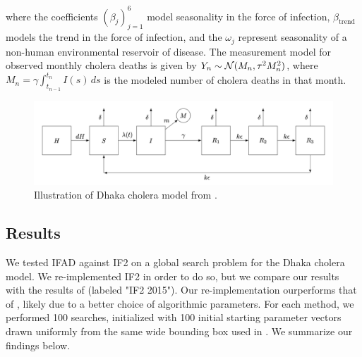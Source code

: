 \documentclass[11pt]{article}
\newcommand\arxiv[2]{#1} %
\begin{document}
where the coefficients $(\beta_j)_{j=1}^6$ model seasonality in the force of infection, $\beta_{\text{trend}}$ models the trend in the force of infection, and the $\omega_j$ represent seasonality of a non-human environmental reservoir of disease.
The measurement model for observed monthly cholera deaths is given by 
    $Y_n \sim {\mathcal{N}}(M_n, \tau^2M_n^2)$,
where $M_n=\gamma\int_{t_{n-1}}^{t_n}I(s)\, ds$ is the modeled number of cholera deaths in that month.


\begin{figure}
    \centering
    \includegraphics[width=\arxiv{12cm}{\textwidth/2}]{../imgs/095/tikzcholera.png}
    \vspace*{-7mm}
    \caption{Illustration of Dhaka cholera model from \cite{king08}. }
    \label{fig:tikz-cholera}
\end{figure}

\subsection{Results}

We tested IFAD against IF2 on a global search problem for the Dhaka cholera model.
We re-implemented IF2 in order to do so, but we compare our results with the results of \cite{ionides15} (labeled "IF2 2015").
Our re-implementation ourperforms that of \cite{ionides15}, likely due to a better choice of algorithmic parameters.
For each method, we performed 100 searches, initialized with 100 initial starting parameter vectors drawn uniformly from the same wide bounding box used in \cite{ionides15}. We summarize our findings below. 


  
\end{document}
